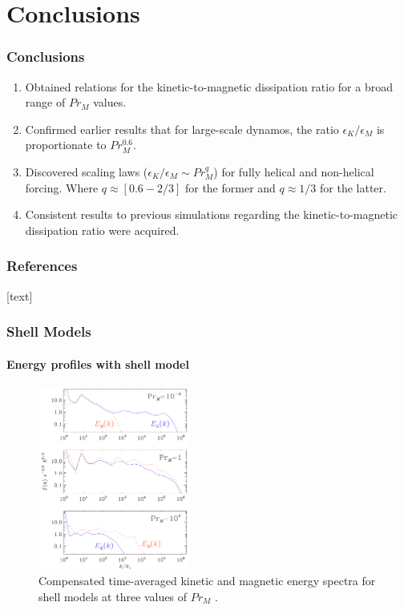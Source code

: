 \documentclass{beamer}
\begin{document}
\section{Conclusions}

\begin{frame}
 \frametitle{Conclusions}
 
 \begin{enumerate}
  \item<1-> Obtained relations for the kinetic-to-magnetic dissipation ratio for a broad range of $Pr_M$ values.
  \item<2-> Confirmed  earlier results that for large-scale dynamos, the ratio $\epsilon_K / \epsilon_M$ is proportionate to $Pr_M^{0.6}$.
  \item<3-> Discovered scaling laws ($\epsilon_K / \epsilon_M \sim Pr_M^q$) for fully helical and non-helical forcing. Where $q\approx [0.6 - 2/3]$ for the former and $q\approx 1/3$ for the latter.
  \item<4-> Consistent results to previous simulations regarding the kinetic-to-magnetic dissipation ratio were acquired.
 \end{enumerate}
 
\end{frame}


\begin{frame}
\frametitle{References}

[text]



\end{frame}

\begin{frame}
 \frametitle{Shell Models}
 \framesubtitle{Energy profiles with shell model}
  
   \begin{figure}[t]
  \includegraphics[width=5cm]{img/E_B_profile}
  \caption{Compensated time-averaged kinetic and magnetic energy spectra for
shell models at three values of $Pr_M$ \cite{brandenburg2014magnetic}.}
  \centering
 \end{figure}
  
\end{frame}
\end{document}
